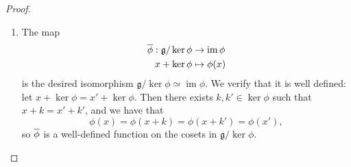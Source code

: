 \documentclass{article}
\DeclareMathOperator{\im}{im}
\newcommand{\frkg}{{\ensuremath{\mathfrak{g}}}}
\begin{document}
\begin{proof}
    \begin{enumerate}[label=(\alph*)]
        \item 
            The map
            \begin{align*}
                \barphi:
                \frkg/\ker\phi
                &\to
                \im \phi
                \\
                x + \ker \phi
                &\mapsto
                \phi(x)
            \end{align*}
            is the desired isomorphism $\frkg / \ker \phi \simeq \im \phi$.
            We verify that it is well defined: let $x + \ker \phi = x' + \ker \phi$.
            Then there exists $k, k' \in \ker \phi$ such that $x + k = x' + k'$, and we have that
            \[
                \phi(x)
                =
                \phi(x + k)
                =
                \phi(x + k')
                =
                \phi(x'),
            \]
            so $\overline{\phi}$ is a well-defined function on the cosets in $\frkg / \ker \phi$.


\end{enumerate}
\end{proof}
\end{document}
